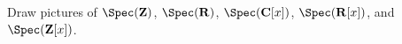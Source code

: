 \begin{exercise}
Draw pictures of \(\Spec(\mathbf Z)\), \(\Spec(\mathbf R)\), \(\Spec(\mathbf C[x])\), \(\Spec(\mathbf R[x])\), and \(\Spec(\mathbf Z[x])\).
\end{exercise}

\begin{solution}

\end{solution}